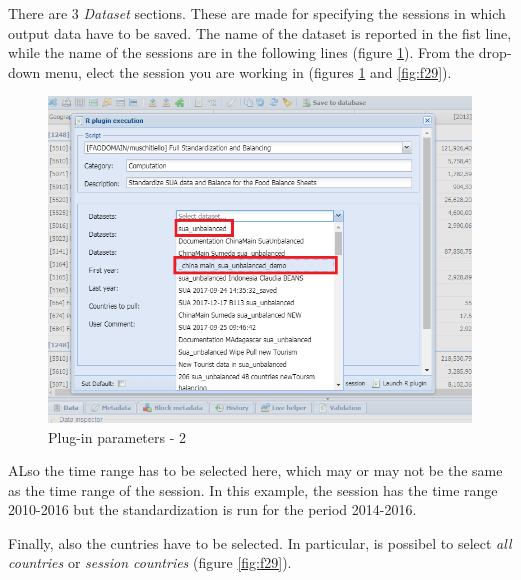 \documentclass[]{article}
\begin{document}
There are 3 \emph{Dataset} sections. These are made for specifying the
sessions in which output data have to be saved. The name of the dataset
is reported in the fist line, while the name of the sessions are in the
following lines (figure \ref{fig:f28}). From the drop-down menu, elect
the session you are working in (figures \ref{fig:f28} and
\ref{fig:f29}).

\begin{figure}[H]

{\centering \includegraphics[width=1\linewidth]{images/standPlugin/27_parametersPI2} 

}

\caption{\label{fig:f28}Plug-in parameters - 2}\label{fig:f28}
\end{figure}

ALso the time range has to be selected here, which may or may not be the
same as the time range of the session. In this example, the session has
the time range 2010-2016 but the standardization is run for the period
2014-2016.

Finally, also the cuntries have to be selected. In particular, is
possibel to select \emph{all countries} or \emph{session countries}
(figure \ref{fig:f29}).
\end{document}
